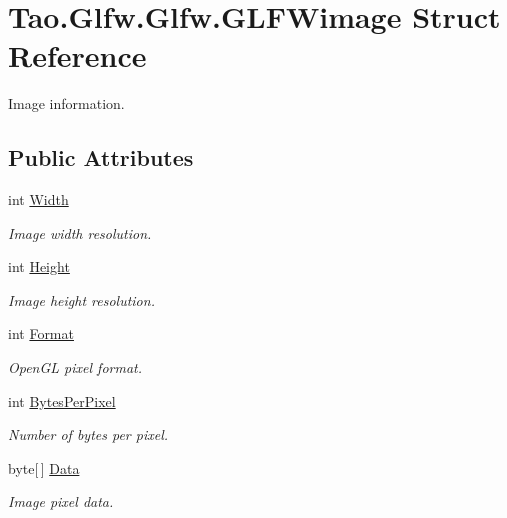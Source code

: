 \hypertarget{struct_tao_1_1_glfw_1_1_glfw_1_1_g_l_f_wimage}{
\section{Tao.Glfw.Glfw.GLFWimage Struct Reference}
\label{struct_tao_1_1_glfw_1_1_glfw_1_1_g_l_f_wimage}
}


Image information.  


\subsection*{Public Attributes}
\begin{DoxyCompactItemize}
\item 
int \hyperlink{struct_tao_1_1_glfw_1_1_glfw_1_1_g_l_f_wimage_a5ed4915bbdf50bcb89675323995db1ba}{Width}
\begin{DoxyCompactList}\small\item\em Image width resolution. \item\end{DoxyCompactList}\item 
int \hyperlink{struct_tao_1_1_glfw_1_1_glfw_1_1_g_l_f_wimage_abf6904ce3e9f1f31721da07236dcec6e}{Height}
\begin{DoxyCompactList}\small\item\em Image height resolution. \item\end{DoxyCompactList}\item 
int \hyperlink{struct_tao_1_1_glfw_1_1_glfw_1_1_g_l_f_wimage_a9ac9923b29ca1aeb1f7001a8f457e894}{Format}
\begin{DoxyCompactList}\small\item\em OpenGL pixel format. \item\end{DoxyCompactList}\item 
int \hyperlink{struct_tao_1_1_glfw_1_1_glfw_1_1_g_l_f_wimage_a4a84a6a34530640ba6ecf5f5873f2f4f}{BytesPerPixel}
\begin{DoxyCompactList}\small\item\em Number of bytes per pixel. \item\end{DoxyCompactList}\item 
byte\mbox{[}$\,$\mbox{]} \hyperlink{struct_tao_1_1_glfw_1_1_glfw_1_1_g_l_f_wimage_a6383c214e0e3c8c22b218d4c206143e6}{Data}
\begin{DoxyCompactList}\small\item\em Image pixel data. \item\end{DoxyCompactList}\end{DoxyCompactItemize}


